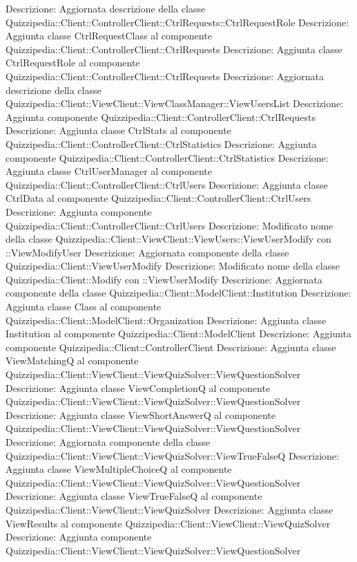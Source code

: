 Descrizione: Aggiornata descrizione della classe Quizzipedia::Client::ControllerClient::CtrlRequests::CtrlRequestRole 
Descrizione: Aggiunta classe CtrlRequestClass al componente Quizzipedia::Client::ControllerClient::CtrlRequests 
Descrizione: Aggiunta classe CtrlRequestRole al componente Quizzipedia::Client::ControllerClient::CtrlRequests 
Descrizione: Aggiornata descrizione della classe Quizzipedia::Client::ViewClient::ViewClassManager::ViewUsersList 
Descrizione: Aggiunta componente Quizzipedia::Client::ControllerClient::CtrlRequests 
Descrizione: Aggiunta classe CtrlStats al componente Quizzipedia::Client::ControllerClient::CtrlStatistics 
Descrizione: Aggiunta componente Quizzipedia::Client::ControllerClient::CtrlStatistics 
Descrizione: Aggiunta classe CtrlUserManager al componente Quizzipedia::Client::ControllerClient::CtrlUsers 
Descrizione: Aggiunta classe CtrlData al componente Quizzipedia::Client::ControllerClient::CtrlUsers 
Descrizione: Aggiunta componente Quizzipedia::Client::ControllerClient::CtrlUsers 
Descrizione: Modificato nome della classe Quizzipedia::Client::ViewClient::ViewUsers::ViewUserModify con ::ViewModifyUser 
Descrizione: Aggiornata componente della classe Quizzipedia::Client::ViewUserModify 
Descrizione: Modificato nome della classe Quizzipedia::Client::Modify con ::ViewUserModify 
Descrizione: Aggiornata componente della classe Quizzipedia::Client::ModelClient::Institution 
Descrizione: Aggiunta classe Class al componente Quizzipedia::Client::ModelClient::Organization 
Descrizione: Aggiunta classe Institution al componente Quizzipedia::Client::ModelClient 
Descrizione: Aggiunta componente Quizzipedia::Client::ControllerClient 
Descrizione: Aggiunta classe ViewMatchingQ al componente Quizzipedia::Client::ViewClient::ViewQuizSolver::ViewQuestionSolver 
Descrizione: Aggiunta classe ViewCompletionQ al componente Quizzipedia::Client::ViewClient::ViewQuizSolver::ViewQuestionSolver 
Descrizione: Aggiunta classe ViewShortAnswerQ al componente Quizzipedia::Client::ViewClient::ViewQuizSolver::ViewQuestionSolver 
Descrizione: Aggiornata componente della classe Quizzipedia::Client::ViewClient::ViewQuizSolver::ViewTrueFalseQ 
Descrizione: Aggiunta classe ViewMultipleChoiceQ al componente Quizzipedia::Client::ViewClient::ViewQuizSolver::ViewQuestionSolver 
Descrizione: Aggiunta classe ViewTrueFalseQ al componente Quizzipedia::Client::ViewClient::ViewQuizSolver 
Descrizione: Aggiunta classe ViewResults al componente Quizzipedia::Client::ViewClient::ViewQuizSolver 
Descrizione: Aggiunta componente Quizzipedia::Client::ViewClient::ViewQuizSolver::ViewQuestionSolver 

